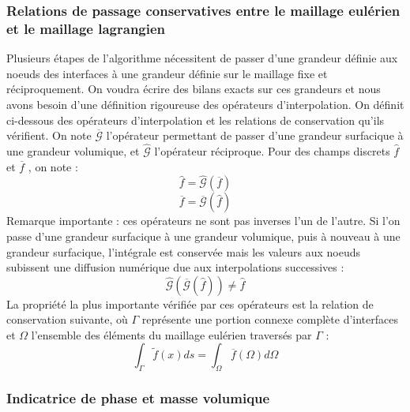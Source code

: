 \subsubsection{Relations de passage conservatives entre le maillage eul\'erien et le maillage lagrangien}
Plusieurs \'etapes de l’algorithme n\'ecessitent de passer d’une grandeur d\'efinie aux noeuds des interfaces à une grandeur d\'efinie sur le maillage fixe et r\'eciproquement.
On voudra \'ecrire des bilans exacts sur ces grandeurs et nous avons besoin d’une d\'efinition rigoureuse des op\'erateurs d’interpolation. On d\'efinit ci-dessous
des op\'erateurs d’interpolation et les relations de conservation qu’ils v\'erifient.
On note $\overline{\mathcal{G}}$ l’op\'erateur permettant de passer d’une grandeur surfacique \`a une grandeur volumique, et $\hat{\mathcal{G}}$ l’op\'erateur r\'eciproque. Pour des champs discrets $\hat{f}$ et $\overline{f}$ , on note :
\begin{equation}
\hat{f} = \hat{\mathcal{G}}(\overline{f})
\end{equation}
\begin{equation}
\overline{f} = \overline{\mathcal{G}}(\hat{f})
\end{equation}
Remarque importante : ces op\'erateurs ne sont pas inverses l’un de l’autre. Si l’on passe d’une grandeur surfacique à une grandeur volumique, puis à nouveau à une grandeur surfacique, l’int\'egrale est conserv\'ee mais les valeurs aux noeuds subissent une diffusion num\'erique due aux interpolations successives :
\begin{equation}
\hat{\mathcal{G}} \left( \overline{\mathcal{G}} \left( \hat{f} \right) \right) \neq  
\hat{f} 
\end{equation}
La propri\'et\'e la plus importante v\'erifi\'ee par ces op\'erateurs est la relation de conservation suivante, où $\Gamma$ repr\'esente une portion connexe complète d’interfaces et $\Omega$ l’ensemble des \'el\'ements du maillage eul\'erien travers\'es par $\Gamma$ :
\begin{equation}
\int_{\Gamma} \tilde{f}(x) ds = \int_{\Omega} \overline{f}(\Omega) d\Omega
\end{equation}

\subsubsection{Indicatrice de phase et masse volumique}

